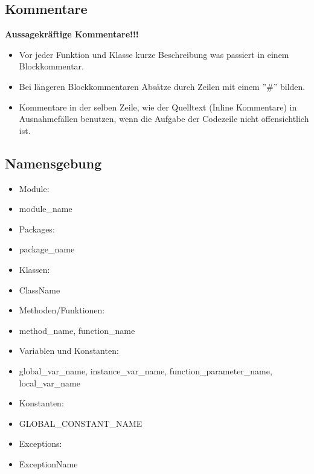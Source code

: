 \documentclass[11pt]{scrartcl}
\begin{document}
		\subsection{Kommentare}
			\textbf{Aussagekr\"aftige Kommentare!!!}
			\begin{itemize}
				\item[] Vor jeder Funktion und Klasse kurze Beschreibung was passiert in einem Blockkommentar.
				\item[] Bei l\"angeren Blockkommentaren Abs\"atze durch Zeilen mit einem ''\#'' bilden.
				\item[] Kommentare in der selben Zeile, wie der Quelltext (Inline Kommentare) in Ausnahmef\"allen benutzen, wenn die Aufgabe der Codezeile nicht offensichtlich ist.
			\end{itemize}
		\subsection{Namensgebung}
			\begin{itemize}
				\item Module:
				\item[] module\_name
				\item Packages:
				\item[] package\_name
				\item Klassen:
				\item[] ClassName
				\item Methoden/Funktionen:
				\item[] method\_name, function\_name
				\item Variablen und Konstanten:
				\item[] global\_var\_name, instance\_var\_name,  function\_parameter\_name, local\_var\_name
				\item Konstanten:
				\item[] GLOBAL\_CONSTANT\_NAME
				\item Exceptions:
				\item[] ExceptionName
			\end{itemize}		
\end{document}
